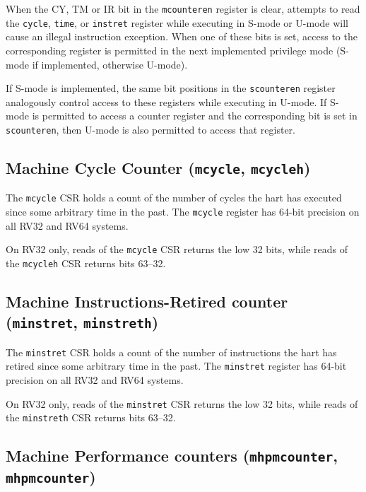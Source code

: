 When the CY, TM or IR bit in the \texttt{mcounteren}
register is clear, attempts to read the \texttt{cycle}, \texttt{time}, or
\texttt{instret} register while executing in
S-mode or U-mode will cause an illegal instruction exception.  When
one of these bits is set, access to the corresponding register is
permitted in the next implemented privilege mode (S-mode if
implemented, otherwise U-mode).

If S-mode is implemented, the same bit positions in the \texttt{scounteren}
register analogously control access to these registers while executing
in U-mode.  If S-mode is permitted to access a counter register and the
corresponding bit is set in \texttt{scounteren}, then U-mode is also permitted
to access that register.

\subsection{Machine Cycle Counter (\texttt{mcycle},
\texttt{mcycleh})}\label{machine-cycle-counter-mcycle-mcycleh}

The \texttt{mcycle} CSR holds a count of the number of cycles the hart has
executed since some arbitrary time in the past. The \texttt{mcycle} register has
64-bit precision on all RV32 and RV64 systems.

On RV32 only, reads of the \texttt{mcycle} CSR returns the low 32 bits, while
reads of the \texttt{mcycleh} CSR returns bits 63--32.

\subsection{Machine Instructions-Retired counter (\texttt{minstret},
\texttt{minstreth})} \label{machine-instructions-retired-counter-minstret-minstreth}

The \texttt{minstret} CSR holds a count of the number of instructions the hart
has retired since some arbitrary time in the past. The \texttt{minstret}
register has 64-bit precision on all RV32 and RV64 systems.

On RV32 only, reads of the \texttt{minstret} CSR returns the low 32 bits, while
reads of the \texttt{minstreth} CSR returns bits 63--32.

\subsection{Machine Performance counters (\texttt{mhpmcounter},
\texttt{mhpmcounter})} \label{machine-performance-counters-mhpmcounter-mhpmcounterh}

